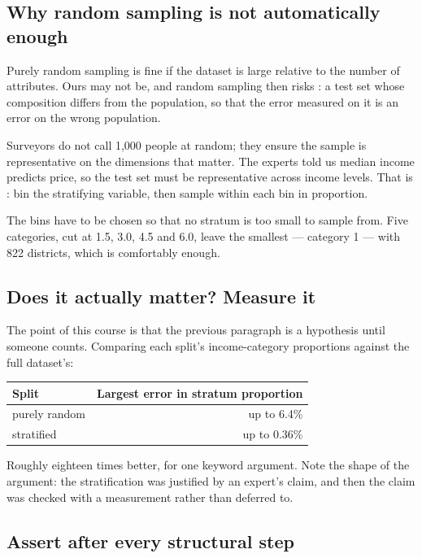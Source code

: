 \documentclass[11pt,a4paper]{article}
\begin{document}
\subsection{Why random sampling is not automatically enough}

Purely random sampling is fine if the dataset is large relative to the number
of attributes. Ours may not be, and random sampling then risks : a test set whose composition differs from the population, so that the
error measured on it is an error on the wrong population.

Surveyors do not call 1{,}000 people at random; they ensure the sample is
representative on the dimensions that matter. The experts told us median income
predicts price, so the test set must be representative across income levels.
That is : bin the stratifying variable, then sample
within each bin in proportion.

The bins have to be chosen so that no stratum is too small to sample from. Five
categories, cut at 1.5, 3.0, 4.5 and 6.0, leave the smallest --- category 1 ---
with 822 districts, which is comfortably enough.

\subsection{Does it actually matter? Measure it}

The point of this course is that the previous paragraph is a hypothesis until
someone counts. Comparing each split's income-category proportions against the
full dataset's:

\begin{center}
\small
\begin{tabular}{lr}
\toprule
\textbf{Split} & \textbf{Largest error in stratum proportion} \\
\midrule
purely random & up to 6.4\% \\
stratified    & up to 0.36\% \\
\bottomrule
\end{tabular}
\end{center}

Roughly eighteen times better, for one keyword argument. Note the shape of the
argument: the stratification was justified by an expert's claim, and then the
claim was checked with a measurement rather than deferred to.

\subsection{Assert after every structural step}
\end{document}
